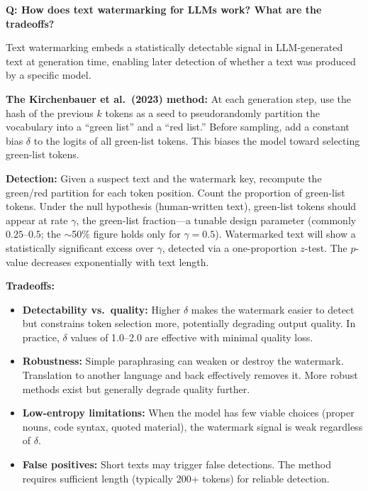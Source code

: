 \begin{interviewq}
\textbf{Q: How does text watermarking for LLMs work? What are the tradeoffs?}

 \quad {} \quad \badgefreq{\freqlow}

\stronganswer
Text watermarking embeds a statistically detectable signal in LLM-generated
text at generation time, enabling later detection of whether a text was
produced by a specific model.

\textbf{The Kirchenbauer et al.\ (2023) method:}  At each generation step,
use the hash of the previous $k$ tokens as a seed to pseudorandomly partition
the vocabulary into a ``green list'' and a ``red list.''  Before sampling,
add a constant bias $\delta$ to the logits of all green-list tokens.  This
biases the model toward selecting green-list tokens.

\textbf{Detection:}  Given a suspect text and the watermark key, recompute
the green/red partition for each token position.  Count the proportion of
green-list tokens.  Under the null hypothesis (human-written text), green-list
tokens should appear at rate $\gamma$, the green-list fraction---a tunable
design parameter (commonly $0.25$--$0.5$; the $\sim$50\% figure holds only
for $\gamma = 0.5$).  Watermarked text will show a
statistically significant excess over $\gamma$, detected via a one-proportion
$z$-test.  The $p$-value decreases exponentially with text length.

\textbf{Tradeoffs:}
\begin{itemize}
    \item \textbf{Detectability vs.\ quality:} Higher $\delta$ makes the
    watermark easier to detect but constrains token selection more, potentially
    degrading output quality.  In practice, $\delta$ values of 1.0--2.0 are
    effective with minimal quality loss.
    \item \textbf{Robustness:} Simple paraphrasing can weaken or destroy the
    watermark.  Translation to another language and back effectively removes
    it.  More robust methods exist but generally degrade quality further.
    \item \textbf{Low-entropy limitations:} When the model has few viable
    choices (proper nouns, code syntax, quoted material), the watermark signal
    is weak regardless of $\delta$.
    \item \textbf{False positives:} Short texts may trigger false detections.
    The method requires sufficient length (typically 200+ tokens) for reliable
    detection.
\end{itemize}


\end{interviewq}
